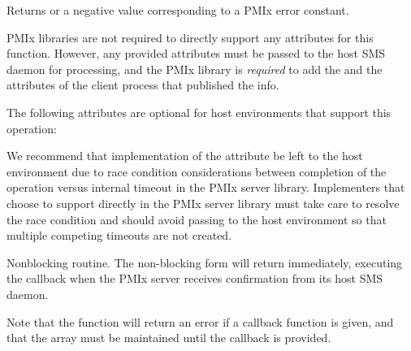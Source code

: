 \begin{arglist}
\end{arglist}

Returns  or a negative value corresponding to a PMIx error constant.

\reqattrstart
\ac{PMIx} libraries are not required to directly support any attributes for this function. However, any provided attributes must be passed to the host \ac{SMS} daemon for processing, and the \ac{PMIx} library is \textit{required} to add the  and the  attributes of the client process that published the info.

\reqattrend

\optattrstart
The following attributes are optional for host environments that support this operation:


\optattrend

\adviceimplstart
We recommend that implementation of the  attribute be left to the host environment due to race condition considerations between completion of the operation versus internal timeout in the \ac{PMIx} server library. Implementers that choose to support  directly in the \ac{PMIx} server library must take care to resolve the race condition and should avoid passing  to the host environment so that multiple competing timeouts are not created.
\adviceimplend

\descr

Nonblocking  routine. The non-blocking form will return immediately, executing the callback when the \ac{PMIx} server receives confirmation from its host \ac{SMS} daemon.

Note that the function will return an error if a  callback function is given, and that the  array must be maintained until the callback is provided.


\subsection{}

